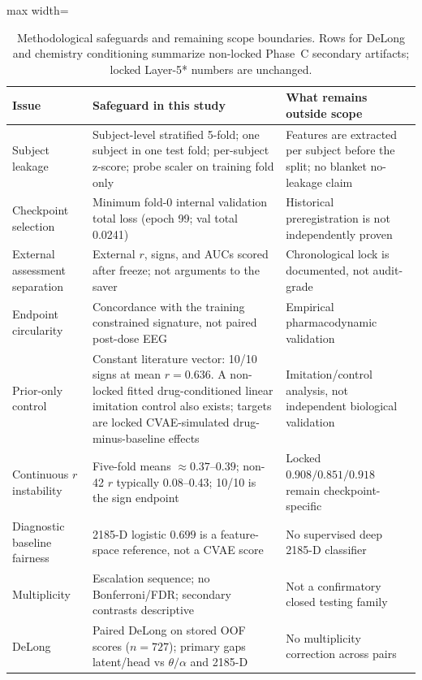 \begin{table}[!t]
\centering
\footnotesize
\setlength{\tabcolsep}{3pt}
\caption{Methodological safeguards and remaining scope boundaries. Rows for DeLong and chemistry conditioning summarize non-locked Phase~C secondary artifacts; locked Layer-5* numbers are unchanged.}
\label{tab:reviewer-defense}
\begin{adjustbox}{max width=\textwidth}
\begin{tabular}{@{}p{}p{}p{}@{}}
\toprule
Issue & Safeguard in this study & What remains outside scope \\
\midrule
Subject leakage & Subject-level stratified 5-fold; one subject in one test fold; per-subject z-score; probe scaler on training fold only & Features are extracted per subject before the split; no blanket no-leakage claim \\
Checkpoint selection & Minimum fold-0 internal validation total loss (epoch 99; val total 0.0241) & Historical preregistration is not independently proven \\
External assessment separation & External \(r\), signs, and AUCs scored after freeze; not arguments to the saver & Chronological lock is documented, not audit-grade \\
Endpoint circularity & Concordance with the training constrained signature, not paired post-dose EEG & Empirical pharmacodynamic validation \\
Prior-only control & Constant literature vector: 10/10 signs at mean \(r{=}0.636\). A non-locked fitted drug-conditioned linear imitation control also exists; targets are locked CVAE-simulated drug-minus-baseline effects & Imitation/control analysis, not independent biological validation \\
Continuous \(r\) instability & Five-fold means \(\approx 0.37\)--\(0.39\); non-42 \(r\) typically 0.08--0.43; 10/10 is the sign endpoint & Locked \(0.908/0.851/0.918\) remain checkpoint-specific \\
Diagnostic baseline fairness & 2185-D logistic \(0.699\) is a feature-space reference, not a CVAE score & No supervised deep 2185-D classifier \\
Multiplicity & Escalation sequence; no Bonferroni/FDR; secondary contrasts descriptive & Not a confirmatory closed testing family \\
DeLong & Paired DeLong on stored OOF scores (\(n{=}727\)); primary gaps latent/head vs \(\theta/\alpha\) and 2185-D & No multiplicity correction across pairs \\

\end{tabular}
\end{adjustbox}
\end{table}
